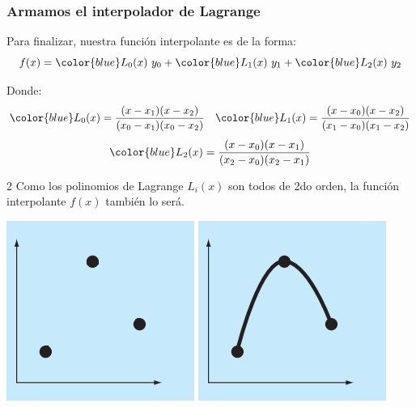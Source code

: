 \documentclass[11pt,xcolor={rgb}]{beamer}
\begin{document}
\begin{frame}[fragile=singleslide]
\frametitle{Armamos el interpolador de Lagrange}

Para finalizar, nuestra funci\'on interpolante es de la forma:
$$f(x) = {\color{blue}L_0(x)}\ y_0 + {\color{blue}L_1(x)}\ y_1 + {\color{blue}L_2(x)}\ y_2$$

Donde:
$${\color{blue}L_0(x)}=\frac{(x-x_1)(x-x_2)}{(x_0-x_1)(x_0-x_2)} \quad {\color{blue}L_1(x)}=\frac{(x-x_0)(x-x_2)}{(x_1-x_0)(x_1-x_2)} $$
$${\color{blue}L_2(x)}=\frac{(x-x_0)(x-x_1)}{(x_2-x_0)(x_2-x_1)}$$

\begin{multicols} {2}
Como los polinomios de Lagrange $L_i(x)$ son todos de 2do orden, la funci\'on interpolante $f(x)$ tambi\'en lo ser\'a.

\begin{center}
	\includegraphics[scale=0.4]{puntos}
	\includegraphics[scale=0.4]{puntos_interpolados}
\end{center}
\end{multicols}

\end{frame}
\end{document}

